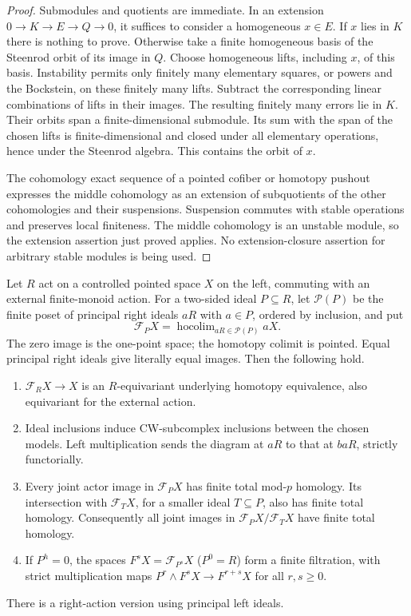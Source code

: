 \begin{proof}
Submodules and quotients are immediate.  In an extension
$0\to K\to E\to Q\to0$, it suffices to consider a homogeneous
$x\in E$.  If $x$ lies in $K$ there is nothing to prove.  Otherwise take a finite homogeneous basis
of the Steenrod orbit of its image in $Q$.  Choose homogeneous lifts,
including $x$, of this basis.  Instability permits only finitely many
elementary squares, or powers and the Bockstein, on these finitely
many lifts.  Subtract the corresponding linear combinations of lifts
in their images.  The resulting finitely many errors lie in $K$.
Their orbits span a finite-dimensional submodule.  Its sum with the
span of the chosen lifts is finite-dimensional and closed under all
elementary operations, hence under the Steenrod algebra.  This
contains the orbit of $x$.

The cohomology exact sequence of a pointed cofiber or homotopy
pushout expresses the middle cohomology as an extension of
subquotients of the other cohomologies and their suspensions.
Suspension commutes with stable operations and preserves local
finiteness.  The middle cohomology is an unstable module, so the
extension assertion just proved applies.  No extension-closure
assertion for arbitrary stable modules is being used.
\end{proof}

\begin{lemma}\label{E:principal-image-replacement}
Let $R$ act on a controlled pointed space $X$ on the left, commuting
with an external finite-monoid action.  For a two-sided ideal
$P\subseteq R$, let $\mathcal P(P)$ be the finite poset of principal
right ideals $aR$ with $a\in P$, ordered by inclusion, and put
\[
 \mathcal F_P X=\mathop{\operatorname{hocolim}}_{aR\in\mathcal P(P)}
                         aX.
\]
The zero image is the one-point space; the homotopy colimit is
pointed.  Equal principal right ideals give literally equal images.
Then the following hold.
\begin{enumerate}
\item $\mathcal F_R X\to X$ is an $R$-equivariant underlying
      homotopy equivalence, also equivariant for the external action.
\item Ideal inclusions induce CW-subcomplex inclusions between the
      chosen models.  Left multiplication sends the diagram at $aR$
      to that at $baR$, strictly functorially.
\item Every joint actor image in $\mathcal F_P X$ has finite total
      mod-$p$ homology.  Its intersection with $\mathcal F_T X$, for
      a smaller ideal $T\subseteq P$, also has finite total homology.
      Consequently all joint images in
      $\mathcal F_P X/\mathcal F_T X$ have finite total homology.
\item If $P^h=0$, the spaces
      $F^sX=\mathcal F_{P^s}X$ ($P^0=R$) form a finite filtration,
      with strict multiplication maps
      $P^r\wedge F^sX\to F^{r+s}X$ for all $r,s\geq0$.
\end{enumerate}
There is a right-action version using principal left ideals.
\end{lemma}

